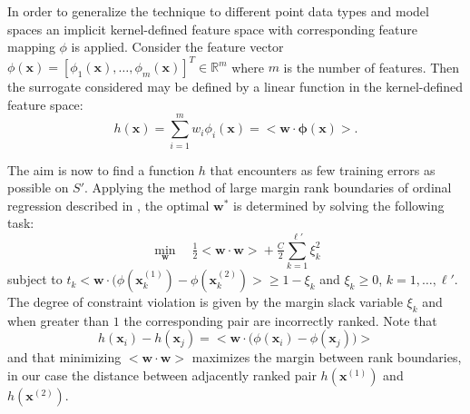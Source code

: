 \documentclass[10pt]{llncs}
\renewcommand{\vec}[1]{{\mbox{\boldmath$#1$}}}
\newcommand{\reals}{{\mathbb R}}
\newcommand{\inner}[2]{\big<\vec{#1}\cdot\vec{#2}\big>}
\renewcommand{\vec}[1]{{\mathbf #1}}
\begin{document}
In order to generalize the technique to different point data
types and model spaces an implicit kernel-defined feature space
with corresponding feature mapping $\phi$ is applied. Consider
the feature vector
$\phi(\vec{x})=[\phi_1(\vec{x}),\ldots,\phi_m(\vec{x})]^T\in
\reals^m$ where $m$ is the number of features. Then the
surrogate considered may be defined by a linear function in the
kernel-defined feature space:
\begin{equation}
h(\vec{x}) = \sum_{i=1}^m w_i\phi_i(\vec{x}) =
\inner{w}{\phi(\vec{x})}.
\end{equation}

The aim is now to find a function $h$ that encounters as few
training errors as possible on $S'$. Applying the method of
large margin rank boundaries of ordinal regression described in
\cite{Herbrich00}, the optimal $\vec{w}^*$ is determined by
solving the following task:
\begin{equation}
\min_{\vec{w}}\quad \tfrac{1}{2}\inner{w}{w} + \tfrac{C}{2}\sum_{k=1}^{\ell'}\xi_k^2
\label{eq:margin}
\end{equation}
subject to
$t_k\inner{w}{(\phi(\vec{x}_k^{(1)})-\phi(\vec{x}_k^{(2)})}\ge 1
- \xi_k$ and $\xi_k \ge 0$, $k = 1,\ldots, \ell'$. The degree
of constraint violation is given by the margin slack variable
$\xi_k$ and when greater than $1$ the corresponding pair are
incorrectly ranked. Note that
\begin{equation}
h(\vec{x}_i)-h(\vec{x}_j) = \inner{w}{(\phi(\vec{x}_i)-\phi(\vec{x}_j))}
\end{equation}
and that minimizing $\inner{w}{w}$ maximizes the margin between
rank boundaries, in our case the distance between adjacently
ranked pair $h(\vec{x}^{(1)})$ and $h(\vec{x}^{(2)})$.
\end{document}
